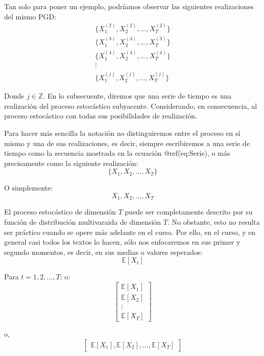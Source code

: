 \documentclass[
  a4paper,
]{article}
\begin{document}
Tan solo para poner un ejemplo, podríamos observar las siguientes
realizaciones del mismo PGD: \begin{eqnarray*}
    & \{X^{(2)}_1, X^{(2)}_2, \ldots, X^{(2)}_T\} & \\
    & \{X^{(3)}_1, X^{(3)}_2, \ldots, X^{(3)}_T\} & \\
    & \{X^{(4)}_1, X^{(4)}_2, \ldots, X^{(4)}_T\} & \\
    & \vdots & \\
    & \{X^{(j)}_1, X^{(j)}_2, \ldots, X^{(j)}_T\} & 
\end{eqnarray*}

Donde \(j \in \mathbb{Z}\). En lo subsecuente, diremos que una serie de
tiempo es una realización del proceso estocástico subyacente.
Considerando, en consecuencia, al proceso estocástico con todas sus
posibilidades de realización.

Para hacer más sencilla la notación no distinguiremos entre el proceso
en sí mismo y una de sus realizaciones, es decir, siempre escribiremos a
una serie de tiempo como la secuencia mostrada en la ecuación
@ref(eq:Serie), o más precisamente como la siguiente realización: \[
    \{ X_1, X_2, \ldots, X_T \}
\]

O simplemente: \[
    X_1, X_2, \ldots, X_T
\]

El proceso estocástico de dimensión \(T\) puede ser completamente
descrito por su función de distribución multivaraida de dimensión \(T\).
No obstante, esto no resulta ser práctico cuando se opere más adelante
en el curso. Por ello, en el curso, y en general casi todos los textos
lo hacen, sólo nos enfocaremos en sus primer y segundo momentos, es
decir, en sus medias o valores esperados: \begin{equation*}
    \mathbb{E}[X_t]
\end{equation*}

Para \(t = 1, 2, \ldots, T\); o: \begin{equation*}
\left[
    \begin{array}{c}
    \mathbb{E}[X_1] \\
    \mathbb{E}[X_2] \\
    \vdots \\
    \mathbb{E}[X_T]
    \end{array}
\right]
\end{equation*}

o, \begin{equation*}
\left[
    \begin{array}{c}
    \mathbb{E}[X_1], \mathbb{E}[X_2], \ldots, \mathbb{E}[X_T]
    \end{array}
\right]
\end{equation*}
\end{document}
